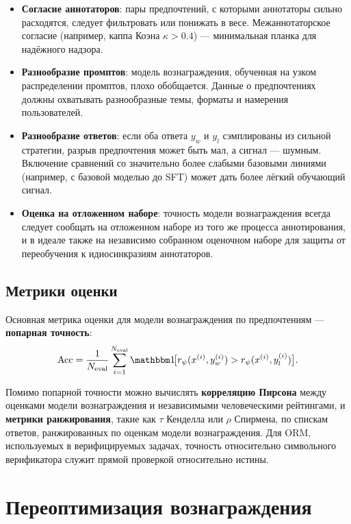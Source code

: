 \begin{itemize}[leftmargin=*]
  \item \textbf{Согласие аннотаторов}: пары предпочтений, с которыми аннотаторы сильно расходятся, следует фильтровать или понижать в весе. Межаннотаторское согласие (например, каппа Коэна $\kappa > 0.4$) --- минимальная планка для надёжного надзора.
  \item \textbf{Разнообразие промптов}: модель вознаграждения, обученная на узком распределении промптов, плохо обобщается. Данные о предпочтениях должны охватывать разнообразные темы, форматы и намерения пользователей.
  \item \textbf{Разнообразие ответов}: если оба ответа $y_w$ и $y_l$ сэмплированы из сильной стратегии, разрыв предпочтения может быть мал, а сигнал --- шумным. Включение сравнений со значительно более слабыми базовыми линиями (например, с базовой моделью до SFT) может дать более лёгкий обучающий сигнал.
  \item \textbf{Оценка на отложенном наборе}: точность модели вознаграждения всегда следует сообщать на отложенном наборе из того же процесса аннотирования, и в идеале также на независимо собранном оценочном наборе для защиты от переобучения к идиосинкразиям аннотаторов.
\end{itemize}

\subsection{Метрики оценки}

Основная метрика оценки для модели вознаграждения по предпочтениям --- \textbf{попарная точность}:
\begin{equation}
\label{eq:rm-accuracy}
\mathrm{Acc} = \frac{1}{N_{\mathrm{eval}}}\sum_{i=1}^{N_{\mathrm{eval}}} \ind\!\bigl[r_\psi(x^{(i)}, y_w^{(i)}) > r_\psi(x^{(i)}, y_l^{(i)})\bigr].
\end{equation}

Помимо попарной точности можно вычислять \textbf{корреляцию Пирсона} между оценками модели вознаграждения и независимыми человеческими рейтингами, и \textbf{метрики ранжирования}, такие как $\tau$ Кенделла или $\rho$ Спирмена, по спискам ответов, ранжированных по оценкам модели вознаграждения. Для ORM, используемых в верифицируемых задачах, точность относительно символьного верификатора служит прямой проверкой относительно истины.

\section{Переоптимизация вознаграждения}
\label{sec:overoptimization}

